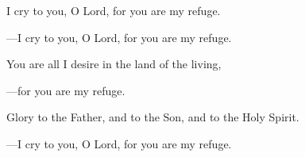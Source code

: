 \responsory
\begin{hangpar}

I cry to you, O Lord, for you are my refuge.

{\color{red}---\thinspace}I cry to you, O Lord, for you are my refuge.

\medskip You are all I desire in the land of the living,

{\color{red}---\thinspace}for you are my refuge.

\medskip Glory to the Father, and to the Son, and to the Holy Spirit.

{\color{red}---\thinspace}I cry to you, O Lord, for you are my refuge.
\end{hangpar}
